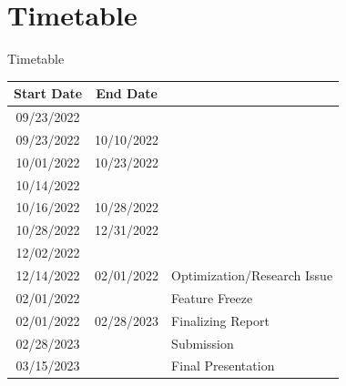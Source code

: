 \documentclass[usenames,dvipsnames,aspectratio=169]{beamer}
\begin{document}
\section{Timetable}
\begin{frame}{Timetable}
\begin{center}
	\begin{small}
	\begin{tabular}{  c  c l }
		
		  Start Date & End Date &  \hspace{2.5mm}\\ 
		 \hline  

		09/23/2022 & 					& \hspace{2.5mm} \color{gray}{Project Start}\\
		09/23/2022 & 10/10/2022 	&  \hspace{2.5mm} \color{gray}{Initial Literature Study}\\
		10/01/2022 & 10/23/2022 	&  \hspace{2.5mm} \color{gray}{Initial Data Search}\\
		\hline  
		10/14/2022 & 					& \hspace{2.5mm} \color{gray}{Kick-Off Presentation}\\

		10/16/2022 & 10/28/2022 	&  \hspace{2.5mm} \color{gray}{Data Conversion/Costs/test execution}\\
		10/28/2022 & 12/31/2022 	&  \hspace{2.5mm} \color{red}{provide WPS/implement LCP}\\
		\hline  
		12/02/2022 & 					& \hspace{2.5mm} \color{gray}{Midterm  Presentation}\\
		
		12/14/2022 & 02/01/2022 	& \hspace{2.5mm} Optimization/Research Issue\\
		02/01/2022 & 					& \hspace{2.5mm} Feature Freeze \\ 

		02/01/2022 & 02/28/2023 	& \hspace{2.5mm} Finalizing Report\\ 
		\hline  
		02/28/2023 & 					& \hspace{2.5mm} Submission  \\
		03/15/2023 & 					& \hspace{2.5mm} Final Presentation  \\
		   
	\end{tabular}
	\end{small}
\end{center}
\end{frame}
\end{document}

